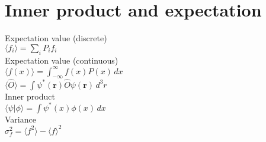 \documentclass[12pt,a4paper]{article}
\begin{document}
	
	\section*{Inner product and expectation}
	\begin{center}
		Expectation value (discrete) \\[.15in]
		\(\langle f_i \rangle = \sum_{i} P_i f_i\) \\[.25in]
		Expectation value (continuous) \\[.15in]
		\(\langle f(x) \rangle = \int_{-\infty}^{\infty} f(x) P(x) \, dx\) \\[.15in]
		\(\langle \hat{O} \rangle = \int \psi^*(\mathbf{r}) \hat{O} \psi(\mathbf{r}) \, d^3r\) \\[.25in]
		Inner product \\[.15in]
		\(\langle \psi | \phi \rangle = \int \psi^*(x) \phi(x) \, dx\) \\[.25in]
		Variance \\[.15in]
		\(\sigma_f^2 = \langle f^2 \rangle - \langle f \rangle^2\)
	\end{center}	
	
	
	
\end{document}
